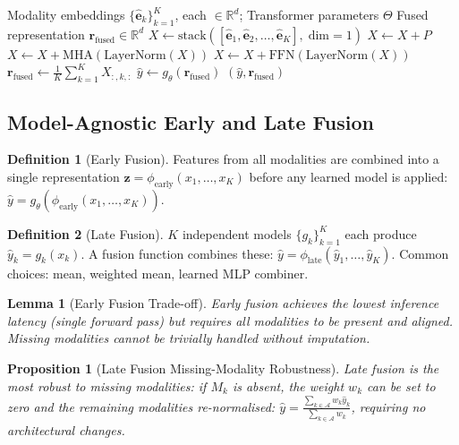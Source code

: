 \documentclass[12pt,a4paper]{article}
\theoremstyle{definition}
\newtheorem{definition}{Definition}[section]
\theoremstyle{plain}
\newtheorem{lemma}[theorem]{Lemma}
\newtheorem{proposition}[theorem]{Proposition}
\theoremstyle{remark}
\newcommand{\R}{\mathbb{R}}
\newcommand{\LN}{\mathrm{LayerNorm}}
\newcommand{\MHA}{\mathrm{MHA}}
\begin{document}
\begin{algorithm}[H]
\caption{Model-Based Multimodal Fusion (Cross-Modal Transformer)}
\label{alg:model_based_fusion}
\begin{algorithmic}[1]
\Require Modality embeddings $\{\hat{\mathbf{e}}_k\}_{k=1}^K$, each $\in \R^d$; Transformer parameters $\Theta$
\Ensure Fused representation $\mathbf{r}_{\text{fused}} \in \R^d$
\State $X \gets \text{stack}([\hat{\mathbf{e}}_1, \hat{\mathbf{e}}_2, \ldots, \hat{\mathbf{e}}_K],\; \text{dim}=1)$ \Comment{$[B, K, d]$}
\State $X \gets X + P$ \Comment{$P \in \R^{K \times d}$ learned modality tags}
  \State $X \gets X + \MHA(\LN(X))$ 
  \State $X \gets X + \text{FFN}(\LN(X))$ 
\EndFor
\State $\mathbf{r}_{\text{fused}} \gets \frac{1}{K}\sum_{k=1}^K X_{:,k,:}$ 
\State $\hat{y} \gets g_\theta(\mathbf{r}_{\text{fused}})$
\State \Return $(\hat{y}, \mathbf{r}_{\text{fused}})$
\end{algorithmic}
\end{algorithm}

\subsection{Model-Agnostic Early and Late Fusion}

\begin{definition}[Early Fusion]
Features from all modalities are combined into a single representation $\mathbf{z} = \phi_{\text{early}}(x_1, \ldots, x_K)$ before any learned model is applied:
$\hat{y} = g_\theta(\phi_{\text{early}}(x_1, \ldots, x_K))$.
\end{definition}

\begin{definition}[Late Fusion]
$K$ independent models $\{g_k\}_{k=1}^K$ each produce $\hat{y}_k = g_k(x_k)$. A fusion function combines these:
$\hat{y} = \phi_{\text{late}}(\hat{y}_1, \ldots, \hat{y}_K)$.
Common choices: mean, weighted mean, learned MLP combiner.
\end{definition}

\begin{lemma}[Early Fusion Trade-off]
Early fusion achieves the lowest inference latency (single forward pass) but requires all modalities to be present and aligned. Missing modalities cannot be trivially handled without imputation.
\end{lemma}

\begin{proposition}[Late Fusion Missing-Modality Robustness]
Late fusion is the most robust to missing modalities: if $M_k$ is absent, the weight $w_k$ can be set to zero and the remaining modalities re-normalised: $\hat{y} = \frac{\sum_{k \in \mathcal{A}} w_k \hat{y}_k}{\sum_{k \in \mathcal{A}} w_k}$, requiring no architectural changes.
\end{proposition}
\end{document}
